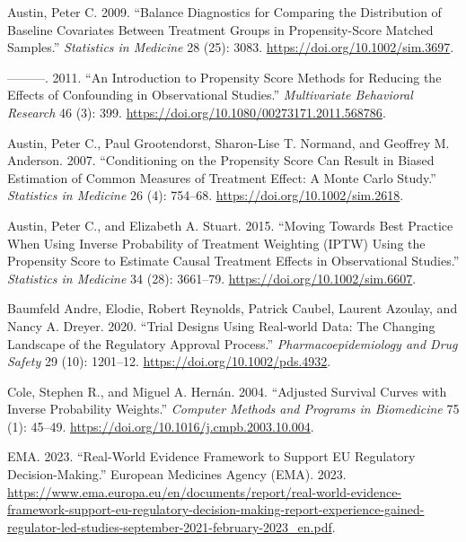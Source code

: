 \documentclass[
]{book}
\newlength{\cslhangindent}
\newenvironment{CSLReferences}[2] %
 {\begin{list}{}{%
  \setlength{\itemindent}{0pt}
  \setlength{\leftmargin}{0pt}
  \setlength{\parsep}{0pt}
  \ifodd #1
   \setlength{\leftmargin}{\cslhangindent}
   \setlength{\itemindent}{-1\cslhangindent}
  \fi
  \setlength{\itemsep}{#2\baselineskip}}}
 {\end{list}}
\begin{document}
\label{refs}
\begin{CSLReferences}{1}{0}
Austin, Peter C. 2009. {``Balance Diagnostics for Comparing the
Distribution of Baseline Covariates Between Treatment Groups in
Propensity-Score Matched Samples.''} \emph{Statistics in Medicine} 28
(25): 3083. \url{https://doi.org/10.1002/sim.3697}.

---------. 2011. {``An Introduction to Propensity Score Methods for
Reducing the Effects of Confounding in Observational Studies.''}
\emph{Multivariate Behavioral Research} 46 (3): 399.
\url{https://doi.org/10.1080/00273171.2011.568786}.

Austin, Peter C., Paul Grootendorst, Sharon-Lise T. Normand, and
Geoffrey M. Anderson. 2007. {``Conditioning on the Propensity Score Can
Result in Biased Estimation of Common Measures of Treatment Effect: A
Monte Carlo Study.''} \emph{Statistics in Medicine} 26 (4): 754--68.
\url{https://doi.org/10.1002/sim.2618}.

Austin, Peter C., and Elizabeth A. Stuart. 2015. {``Moving Towards Best
Practice When Using Inverse Probability of Treatment Weighting ({IPTW})
Using the Propensity Score to Estimate Causal Treatment Effects in
Observational Studies.''} \emph{Statistics in Medicine} 34 (28):
3661--79. \url{https://doi.org/10.1002/sim.6607}.

Baumfeld Andre, Elodie, Robert Reynolds, Patrick Caubel, Laurent
Azoulay, and Nancy A. Dreyer. 2020. {``Trial Designs Using Real‐world
Data: The Changing Landscape of the Regulatory Approval Process.''}
\emph{Pharmacoepidemiology and Drug Safety} 29 (10): 1201--12.
\url{https://doi.org/10.1002/pds.4932}.

Cole, Stephen R., and Miguel A. Hernán. 2004. {``Adjusted Survival
Curves with Inverse Probability Weights.''} \emph{Computer Methods and
Programs in Biomedicine} 75 (1): 45--49.
\url{https://doi.org/10.1016/j.cmpb.2003.10.004}.

EMA. 2023. {``Real-World Evidence Framework to Support EU Regulatory
Decision-Making.''} European Medicines Agency (EMA). 2023.
\url{https://www.ema.europa.eu/en/documents/report/real-world-evidence-framework-support-eu-regulatory-decision-making-report-experience-gained-regulator-led-studies-september-2021-february-2023_en.pdf}.


\end{CSLReferences}
\end{document}
